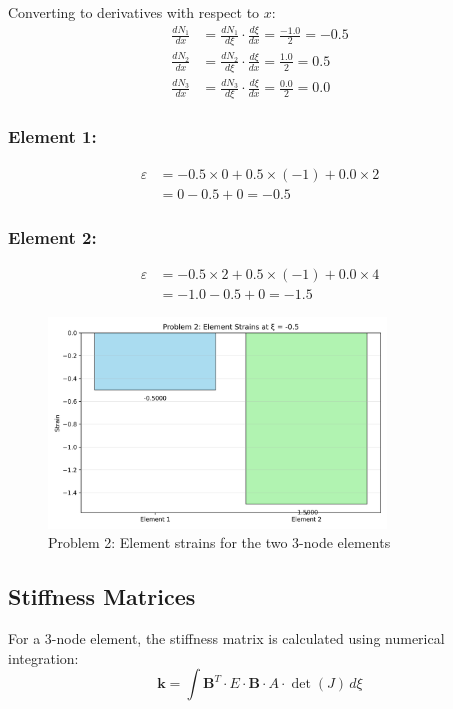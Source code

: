 \documentclass[12pt,a4paper]{article}
\begin{document}
Converting to derivatives with respect to $x$:
\begin{align}
\frac{dN_1}{dx} &= \frac{dN_1}{d\xi} \cdot \frac{d\xi}{dx} = \frac{-1.0}{2} = -0.5 \\
\frac{dN_2}{dx} &= \frac{dN_2}{d\xi} \cdot \frac{d\xi}{dx} = \frac{1.0}{2} = 0.5 \\
\frac{dN_3}{dx} &= \frac{dN_3}{d\xi} \cdot \frac{d\xi}{dx} = \frac{0.0}{2} = 0.0
\end{align}

\subsubsection*{Element 1:}
\begin{align}
\varepsilon &= -0.5 \times 0 + 0.5 \times (-1) + 0.0 \times 2 \\
&= 0 - 0.5 + 0 = -0.5
\end{align}

\subsubsection*{Element 2:}
\begin{align}
\varepsilon &= -0.5 \times 2 + 0.5 \times (-1) + 0.0 \times 4 \\
&= -1.0 - 0.5 + 0 = -1.5
\end{align}

\begin{figure}[H]
\centering
\includegraphics[width=0.8\textwidth]{figures/ps3_problem2_strains.png}
\caption{Problem 2: Element strains for the two 3-node elements}
\label{fig:problem2_strains}
\end{figure}

\subsection{Stiffness Matrices}
For a 3-node element, the stiffness matrix is calculated using numerical integration:
\begin{equation}
\mathbf{k} = \int\mathbf{B}^T \cdot E \cdot \mathbf{B} \cdot A \cdot \det(J) \, d\xi
\end{equation}
\end{document}
